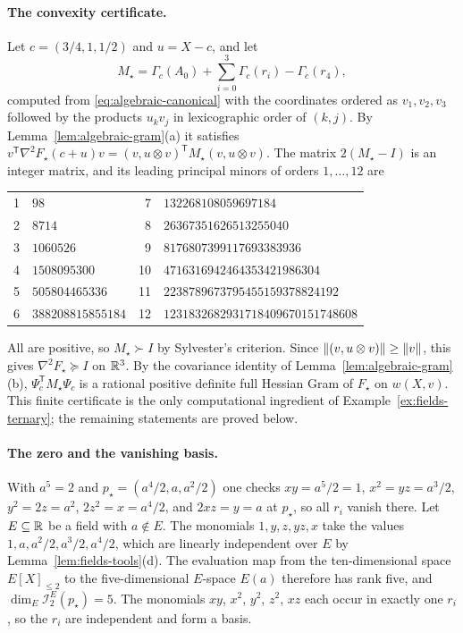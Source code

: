 \paragraph{The convexity certificate.}
Let $c=(3/4,1,1/2)$ and $u=X-c$, and let
\[
 M_\star=\Gamma_c(A_0)+\sum_{i=0}^3\Gamma_c(r_i)-\Gamma_c(r_4),
\]
computed from \eqref{eq:algebraic-canonical} with the coordinates ordered
as $v_1,v_2,v_3$ followed by the products $u_kv_j$ in lexicographic order of
$(k,j)$. By
Lemma~\ref{lem:algebraic-gram}(a) it satisfies
$v^{\mathsf T}\nabla^2F_\star(c+u)v=(v,u\otimes v)^{\mathsf T}M_\star(v,u\otimes v)$.
The matrix $2(M_\star-I)$ is an integer matrix, and its leading principal
minors of orders $1,\ldots,12$ are
\begin{center}\small
\begin{tabular}{rl@{\qquad}rl}
1 & $98$ & 7 & $132268108059697184$\\
2 & $8714$ & 8 & $26367351626513255040$\\
3 & $1060526$ & 9 & $8176807399117693383936$\\
4 & $1508095300$ & 10 & $4716316942464353421986304$\\
5 & $505804465336$ & 11 & $2238789673795455159378824192$\\
6 & $388208815855184$ & 12 & $1231832682931718409670151748608$
\end{tabular}
\end{center}
All are positive, so $M_\star\succ I$ by Sylvester's criterion. Since
$\left\lVert(v,u\otimes v)\right\rVert\ge\left\lVert v\right\rVert$, this gives $\nabla^2F_\star\succeq I$ on
$\mathbb R^3$. By the covariance identity of Lemma~\ref{lem:algebraic-gram}(b),
$\Psi_c^{\mathsf T}M_\star\Psi_c$ is a rational positive definite full Hessian
Gram of $F_\star$ on $w(X,v)$. This finite
certificate is the only computational ingredient of
Example~\ref{ex:fields-ternary}; the remaining statements are proved below.

\paragraph{The zero and the vanishing basis.}
With $a^5=2$ and $p_\star=(a^4/2,a,a^2/2)$ one checks $xy=a^5/2=1$,
$x^2=yz=a^3/2$, $y^2=2z=a^2$, $2z^2=x=a^4/2$, and $2xz=y=a$ at $p_\star$, so
all $r_i$ vanish there. Let $E\subseteq\mathbb R$ be a field with $a\notin E$. The
monomials $1,y,z,yz,x$ take the values $1,a,a^2/2,a^3/2,a^4/2$, which are
linearly independent over $E$ by Lemma~\ref{lem:fields-tools}(d). The
evaluation map from the ten-dimensional space $E[X]_{\le2}$ to the
five-dimensional $E$-space $E(a)$ therefore has rank five, and
$\dim_E\mathcal I_2^E(p_\star)=5$. The monomials $xy$, $x^2$, $y^2$, $z^2$, $xz$
each occur in exactly one $r_i$, so the $r_i$ are independent and form a
basis.

